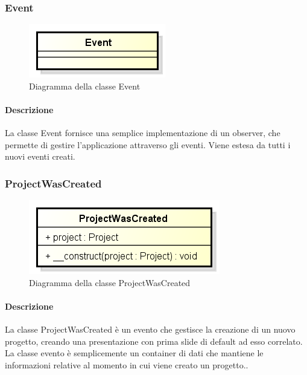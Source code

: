 \subsubsection{Event}
\begin{figure}[h]
	\centering
	\includegraphics[width=0.5\linewidth]{img/premi_back_end_event}
	\caption[Diagramma della classe Event]{Diagramma della classe Event}
	\label{fig:premi_back_end_event}
\end{figure}


\paragraph{Descrizione}
La classe Event fornisce una semplice implementazione di un observer, che permette di gestire l'applicazione attraverso gli eventi. Viene estesa da tutti i nuovi eventi creati.

\newpage
\subsubsection{ProjectWasCreated}
\begin{figure}[h]
	\centering
	\includegraphics[width=0.5\linewidth]{img/premi_back_end_project_was_created}
	\caption[Diagramma della classe ProjectWasCreated]{Diagramma della classe ProjectWasCreated}
	\label{fig:premi_back_end_project_was_created}
\end{figure}


\paragraph{Descrizione}
La classe ProjectWasCreated è un evento che gestisce la creazione di un nuovo progetto, creando una presentazione con prima \gls{slide} di default ad esso correlato. La classe evento è semplicemente un container di dati che mantiene le informazioni relative al momento in cui viene creato un progetto..

